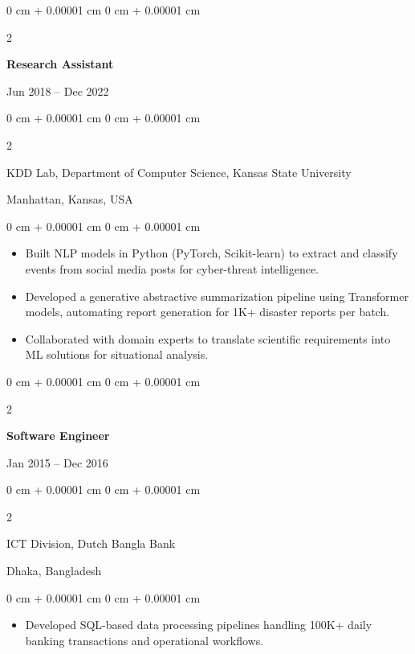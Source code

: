 \documentclass[10pt, letterpaper]{article}
\newenvironment{highlights}{
    \begin{itemize}[
        topsep=0.10 cm,
        parsep=0.10 cm,
        partopsep=0pt,
        itemsep=0pt,
        leftmargin=0 cm + 10pt
    ]
}{
    \end{itemize}
} %
\newenvironment{onecolentry}{
    \begin{adjustwidth}{
        0 cm + 0.00001 cm
    }{
        0 cm + 0.00001 cm
    }
}{
    \end{adjustwidth}
} %
\newenvironment{twocolentry}[2][]{
    \onecolentry
    \def\secondColumn{#2}
    \setcolumnwidth{\fill, 4.5 cm}
    \begin{paracol}{2}
}{
    \switchcolumn \raggedleft \secondColumn
    \end{paracol}
    \endonecolentry
} %
\begin{document}
    \vspace{1mm}
    
    \begin{twocolentry}{Jun 2018 -- Dec 2022}
        \textbf{Research Assistant}
    \end{twocolentry}
    \begin{twocolentry}{Manhattan, Kansas, USA}
       KDD Lab, Department of Computer Science, Kansas State University
    \end{twocolentry}
    \vspace{0.10 cm}
    \begin{onecolentry}
        \begin{highlights}
            \item Built NLP models in Python (PyTorch, Scikit-learn) to extract and classify events from social media posts for cyber-threat intelligence.
            \item Developed a generative abstractive summarization pipeline using Transformer models, automating report generation for 1K+ disaster reports per batch.
            \item Collaborated with domain experts to translate scientific requirements into ML solutions for situational analysis.
        \end{highlights}
    \end{onecolentry}

    \vspace{0.1 cm}
    \begin{twocolentry}{Jan 2015 -- Dec 2016}
        \textbf{Software Engineer}
    \end{twocolentry}
    \begin{twocolentry}{Dhaka, Bangladesh}
       ICT Division, Dutch Bangla Bank
    \end{twocolentry}
    
    \begin{onecolentry}
        \begin{highlights}
            \item Developed SQL-based data processing pipelines handling 100K+ daily banking transactions and operational workflows.
        \end{highlights}
    \end{onecolentry}
    
\end{document}
